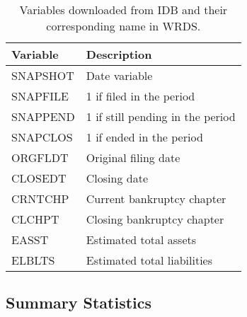 \documentclass[12pt]{article}
\begin{document}
\begin{table}[h!]
    \centering
    \label{tab:IDB}
    \begin{tabular}{ll}
    \toprule
    Variable & Description \\ 
    \midrule
    SNAPSHOT & Date variable \\ 
    SNAPFILE & 1 if filed in the period \\ 
    SNAPPEND & 1 if still pending in the period \\ 
    SNAPCLOS & 1 if ended in the period \\ 
    ORGFLDT & Original filing date \\ 
    CLOSEDT & Closing date \\ 
    CRNTCHP & Current bankruptcy chapter \\ 
    CLCHPT & Closing bankruptcy chapter \\ 
    EASST & Estimated total assets \\ 
    ELBLTS & Estimated total liabilities \\ 
    \bottomrule
  \end{tabular}
  \caption{\small Variables downloaded from IDB and their corresponding name in WRDS.}
\end{table}
    
\subsection{Summary Statistics \label{sec:sumstat}}
\end{document}
